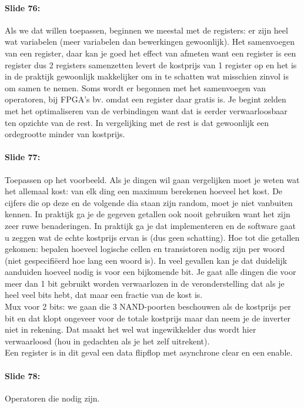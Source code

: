 \documentclass[10pt,a4paper]{book}
\begin{document}
\paragraph{Slide 76:} Als we dat willen toepassen, beginnen we meestal met de registers: er zijn heel wat variabelen (meer variabelen dan bewerkingen gewoonlijk). Het samenvoegen van een register, daar kan je goed het effect van afmeten want een register is een register dus 2 registers samenzetten levert de kostprijs van 1 register op en het is in de praktijk gewoonlijk makkelijker om in te schatten wat misschien zinvol is om samen te nemen. Soms wordt er begonnen met het samenvoegen van operatoren, bij FPGA's bv. omdat een register daar gratis is. Je begint zelden met het optimaliseren van de verbindingen want dat is eerder verwaarloosbaar ten opzichte van de rest. In vergelijking met de rest is dat gewoonlijk een ordegrootte minder van kostprijs.

\paragraph{Slide 77:} Toepassen op het voorbeeld. Als je dingen wil gaan vergelijken moet je weten wat het allemaal kost: van elk ding een maximum berekenen hoeveel het kost. De cijfers die op deze en de volgende dia staan zijn random, moet je niet vanbuiten kennen. In praktijk ga je de gegeven getallen ook nooit gebruiken want het zijn zeer ruwe benaderingen. In praktijk ga je dat implementeren en de software gaat u zeggen wat de echte kostprijs ervan is (dus geen schatting). Hoe tot die getallen gekomen: bepalen hoeveel logische cellen en transistoren nodig zijn per woord (niet gespecifi\"eerd hoe lang een woord is). In veel gevallen kan je dat duidelijk aanduiden hoeveel nodig is voor een bijkomende bit. Je gaat alle dingen die voor meer dan 1 bit gebruikt worden verwaarlozen in de veronderstelling dat als je heel veel bits hebt, dat maar een fractie van de kost is.\\
Mux voor 2 bits: we gaan die 3 NAND-poorten beschouwen als de kostprijs per bit en dat klopt ongeveer voor de totale kostprijs maar dan neem je de inverter niet in rekening. Dat maakt het wel wat ingewikkelder dus wordt hier verwaarloosd (hou in gedachten als je het zelf uitrekent).\\
Een register is in dit geval een data flipflop met asynchrone clear en een enable. 

\paragraph{Slide 78:} Operatoren die nodig zijn. 
\end{document}
